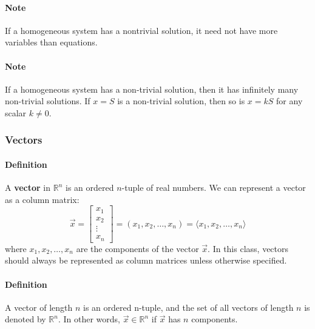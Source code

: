 \paragraph*{Note} If a homogeneous system has a nontrivial solution, it need not have more variables than equations.
\paragraph*{Note} If a homogeneous system has a non-trivial solution, then it has infinitely many non-trivial solutions. If $x = S$ is a non-trivial solution, then so is $x = kS$ for any scalar $k \neq 0$.

\hrulefill

\subsubsection*{Vectors}
\paragraph*{Definition} A \textbf{vector} in $\mathbb{R}^n$ is an ordered $n$-tuple of real numbers. We can represent a vector as a column matrix:
\[\vec{x} = \begin{bmatrix}
    x_1 \\
    x_2 \\
    \vdots \\
    x_n
\end{bmatrix} = (x_1, x_2, \ldots, x_n) = \langle x_1, x_2, \ldots, x_n \rangle\]
where $x_1, x_2, \ldots, x_n$ are the components of the vector $\vec{x}$. In this class, vectors should always be 
represented as column matrices unless otherwise specified.

\paragraph*{Definition} A vector of length $n$ is an ordered n-tuple, and the set of all vectors of length $n$ is denoted by $\mathbb{R}^n$.
In other words, $\vec{x} \in \mathbb{R}^n$ if $\vec{x}$ has $n$ components.

